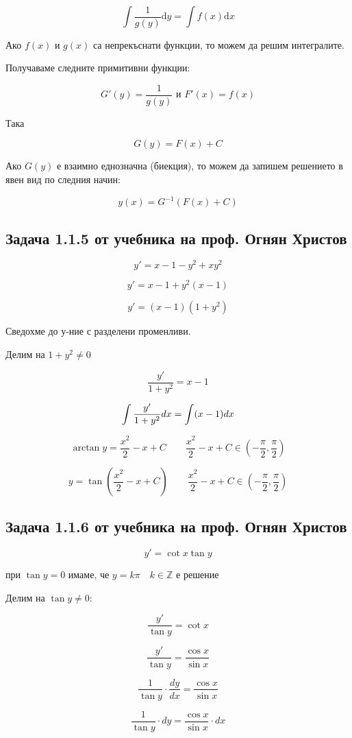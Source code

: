 \documentclass{scrartcl}
\begin{document}
$$\displaystyle\int\dfrac{1}{g(y)}\mathrm{d}y = \int f(x)\mathrm{d}x$$

Ако $f(x)$ и $g(x)$ са непрекъснати функции, то можем да решим интегралите.

Получаваме следните примитивни функции:

$$G'(y) = \dfrac{1}{g(y)} \text{ и } F'(x) = f(x)$$

Така

$$G(y) = F(x) + C$$

Ако $G(y)$ е взаимно еднозначна (биекция), то можем да запишем решението в явен вид по следния начин:

$$y(x) = G^{-1}(F(x) + C)$$

\subsection{Задача 1.1.5 от учебника на проф. Огнян Христов}

$$y' = x-1-y^2+xy^2$$

$$y'  =x-1 + y^2(x-1)$$

$$y'  =(x-1)(1+y^2)$$

Сведохме до у-ние с разделени променливи.

Делим на $1+y^2 \ne 0$

$$\dfrac{y'}{1+y^2} = x-1$$

$$\displaystyle \int \dfrac{y'}{1+y^2}\space dx = \int (x-1)\space dx$$

$$\arctan{y} = \dfrac{x^2}{2}-x+C\qquad\dfrac{x^2}{2}-x+C\in\left(-\dfrac{\pi}{2}, \dfrac{\pi}{2}\right)$$

$$y = \tan{\left(\dfrac{x^2}{2}-x+C\right)}\qquad\dfrac{x^2}{2}-x+C\in\left(-\dfrac{\pi}{2}, \dfrac{\pi}{2}\right)$$

\subsection{Задача 1.1.6 от учебника на проф. Огнян Христов}

$$y' = \cot{x}\tan{y}$$

при $\tan{y} = 0$ имаме, че $y = k\pi \quad k\in\mathbb{Z}$ е решение

Делим на $\tan{y} \ne 0$:

$$\dfrac{y'}{\tan{y}} = \cot{x}$$

$$\dfrac{y'}{\tan{y}} = \dfrac{\cos{x}}{\sin{x}}$$

$$\dfrac{1}{\tan{y}} \cdot \dfrac{dy}{dx} = \dfrac{\cos{x}}{\sin{x}}$$

$$\dfrac{1}{\tan{y}} \cdot dy = \dfrac{\cos{x}}{\sin{x}} \cdot dx$$
\end{document}
